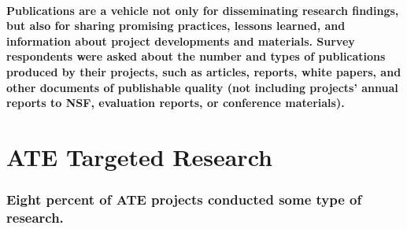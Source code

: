\documentclass[
]{report}
\begin{document}
\hypertarget{publications-are-a-vehicle-not-only-for-disseminating-research-findings-but-also-for-sharing-promising-practices-lessons-learned-and-information-about-project-developments-and-materials.-survey-respondents-were-asked-about-the-number-and-types-of-publications-produced-by-their-projects-such-as-articles-reports-white-papers-and-other-documents-of-publishable-quality-not-including-projects-annual-reports-to-nsf-evaluation-reports-or-conference-materials.}{%
\paragraph{\texorpdfstring{\textbf{Publications} are a vehicle not only for disseminating research findings, but also for sharing promising practices, lessons learned, and information about project developments and materials. Survey respondents were asked about the number and types of publications produced by their projects, such as articles, reports, white papers, and other documents of publishable quality (not including projects' annual reports to NSF, evaluation reports, or conference materials).}{Publications are a vehicle not only for disseminating research findings, but also for sharing promising practices, lessons learned, and information about project developments and materials. Survey respondents were asked about the number and types of publications produced by their projects, such as articles, reports, white papers, and other documents of publishable quality (not including projects' annual reports to NSF, evaluation reports, or conference materials).}}\label{publications-are-a-vehicle-not-only-for-disseminating-research-findings-but-also-for-sharing-promising-practices-lessons-learned-and-information-about-project-developments-and-materials.-survey-respondents-were-asked-about-the-number-and-types-of-publications-produced-by-their-projects-such-as-articles-reports-white-papers-and-other-documents-of-publishable-quality-not-including-projects-annual-reports-to-nsf-evaluation-reports-or-conference-materials.}}

\hypertarget{ate-targeted-research}{%
\section{ATE Targeted Research}\label{ate-targeted-research}}

\hypertarget{eight-percent-of-ate-projects-conducted-some-type-of-research.}{%
\subsubsection{Eight percent of ATE projects conducted some type of research.}\label{eight-percent-of-ate-projects-conducted-some-type-of-research.}}
\end{document}
